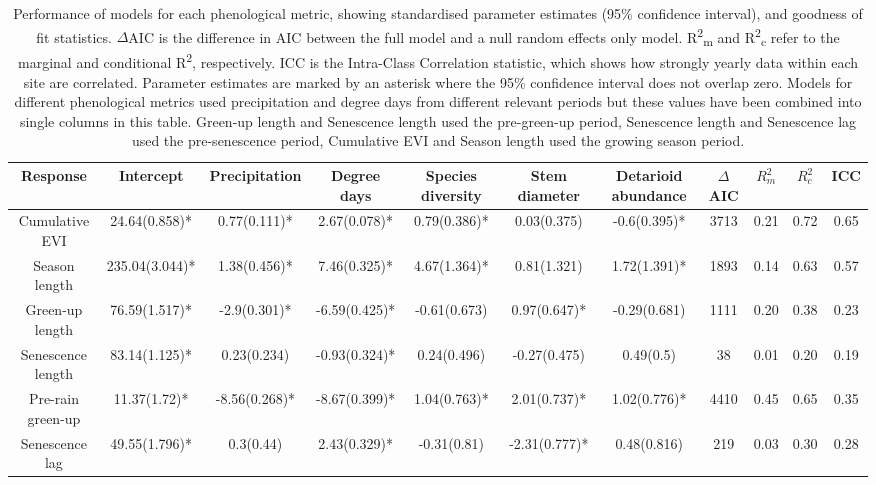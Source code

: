 \documentclass[11pt,a4paper]{article}
\begin{document}
\begin{landscape}
\begin{table}[H]
\centering
\caption{Performance of models for each phenological metric, showing
	standardised parameter estimates (95\% confidence interval), and goodness of
	fit statistics. $\Delta{}$AIC is the difference in AIC between the full model
	and a null random effects only model. R\textsuperscript{2}\textsubscript{m} and
	R\textsuperscript{2}\textsubscript{c} refer to the marginal and conditional
	R\textsuperscript{2}, respectively. ICC is the Intra-Class Correlation
	statistic, which shows how strongly yearly data within each site are
	correlated. Parameter estimates are marked by an asterisk where the 95\%
	confidence interval does not overlap zero. Models for different phenological
	metrics used precipitation and degree days from different relevant periods but
	these values have been combined into single columns in this table. Green-up
	length and Senescence length used the pre-green-up period, Senescence length
	and Senescence lag used the pre-senescence period, Cumulative EVI and Season
	length used the growing season period.}
\label{modtab}
\begin{tabular}{ccccccccccc}
\toprule
Response & Intercept & Precipitation & Degree days & Species diversity & Stem diameter & Detarioid abundance & $\Delta{}$AIC & $R^{2}_{m}$ & $R^{2}_{c}$ & ICC \\ 
\midrule
Cumulative EVI & 24.64(0.858)* & 0.77(0.111)* & 2.67(0.078)* & 0.79(0.386)* & 0.03(0.375) & -0.6(0.395)* & 3713 & 0.21 & 0.72 & 0.65 \\ 
  Season length & 235.04(3.044)* & 1.38(0.456)* & 7.46(0.325)* & 4.67(1.364)* & 0.81(1.321) & 1.72(1.391)* & 1893 & 0.14 & 0.63 & 0.57 \\ 
  Green-up length & 76.59(1.517)* & -2.9(0.301)* & -6.59(0.425)* & -0.61(0.673) & 0.97(0.647)* & -0.29(0.681) & 1111 & 0.20 & 0.38 & 0.23 \\ 
  Senescence length & 83.14(1.125)* & 0.23(0.234) & -0.93(0.324)* & 0.24(0.496) & -0.27(0.475) & 0.49(0.5) & 38 & 0.01 & 0.20 & 0.19 \\ 
  Pre-rain green-up & 11.37(1.72)* & -8.56(0.268)* & -8.67(0.399)* & 1.04(0.763)* & 2.01(0.737)* & 1.02(0.776)* & 4410 & 0.45 & 0.65 & 0.35 \\ 
  Senescence lag & 49.55(1.796)* & 0.3(0.44) & 2.43(0.329)* & -0.31(0.81) & -2.31(0.777)* & 0.48(0.816) & 219 & 0.03 & 0.30 & 0.28 \\ 
\bottomrule
\end{tabular}
\end{table}

\end{landscape}
\end{document}
